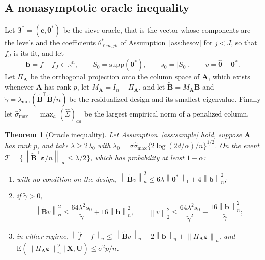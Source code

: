 \documentclass[12pt]{article} %
\newtheorem{theorem}{Theorem}
\theoremstyle{definition}
\newcommand{\R}{\mathbb{R}}
\newcommand{\E}{\mathrm{E}}
\newcommand{\T}{^{\top}}
\newcommand{\norm}[1]{\left\lVert #1 \right\rVert}
\newcommand{\normn}[1]{\left\lVert #1 \right\rVert_{n}}
\newcommand{\cv}{\ell}
\newcommand{\md}{m}
\newcommand{\lev}{j}
\newcommand{\tsl}{k}
\newcommand{\bX}{\mathbf{X}}
\newcommand{\bU}{\mathbf{U}}
\newcommand{\coefs}[4]{\theta^{*}_{#1#2,#3#4}}
\newcommand{\btheta}{\boldsymbol{\theta}}
\newcommand{\thetastar}{\btheta^{*}}
\newcommand{\thetahat}{\widehat{\btheta}}
\newcommand{\bbeta}{\boldsymbol{\beta}}
\newcommand{\betastar}{\bbeta^{*}}
\newcommand{\bc}{\mathbf{c}}
\newcommand{\Gramhat}{\widehat{\Sigma}}
\newcommand{\pen}{\lambda}
\newcommand{\Szero}{S_{0}}
\newcommand{\Amat}{\mathbf{A}}
\newcommand{\Bmat}{\mathbf{B}}
\newcommand{\Btil}{\widetilde{\Bmat}}
\newcommand{\PA}{\Pi_{\Amat}}
\newcommand{\MA}{M_{\Amat}}
\newcommand{\bveps}{\boldsymbol{\varepsilon}}
\newcommand{\bb}{\mathbf{b}}
\newcommand{\smax}{\widehat{\sigma}_{\max}}
\newcommand{\gtil}{\widetilde{\gamma}}
\newcommand{\lmin}{\lambda_{\min}}
\begin{document}
\subsection{A nonasymptotic oracle inequality}
\label{sec:oracle}

Let $\betastar = (\bc,\thetastar)$ be the sieve oracle, that is the vector
whose components are the levels and the coefficients
$\coefs{\cv}{\md}{\lev}{\tsl}$ of Assumption~\ref{ass:besov} for $\lev < J$,
so that $f_J$ is its fit, and let
\[
  \bb = f - f_J \in \R^{n}, \qquad \Szero = \mathrm{supp}(\thetastar),
  \qquad s_0 = |\Szero|, \qquad v = \thetahat - \thetastar .
\]
Let $\PA$ be the orthogonal projection onto the column space of $\Amat$, which
exists whenever $\Amat$ has rank $p$, let $\MA = I_n - \PA$, and let
$\Btil = \MA\Bmat$ and $\gtil = \lmin(\Btil\T\Btil/n)$ be the residualized
design and its smallest eigenvalue. Finally let
$\smax^{2} = \max_a (\Gramhat)_{aa}$ be the largest empirical norm of a
penalized column.

\begin{theorem}[Oracle inequality]
\label{thm:oracle}
Let Assumption~\ref{ass:sample} hold, suppose $\Amat$ has rank $p$, and take
$\pen \ge 2\pen_0$ with
$\pen_0 = \sigma\smax\{2\log(2d/\alpha)/n\}^{1/2}$. On the event
$\mathcal{T} = \{\norm{\Btil\T\bveps/n}_{\infty} \le \pen/2\}$, which has
probability at least $1 - \alpha$:
\begin{enumerate}
\item[(i)] with no condition on the design,
$\normn{\Btil v}^{2} \le 6\pen\norm{\thetastar}_{1} + 4\normn{\bb}^{2}$;
\item[(ii)] if $\gtil > 0$,
\[
  \normn{\Btil v}^{2} \le \frac{64\pen^{2}s_0}{\gtil} + 16\normn{\bb}^{2},
  \qquad
  \norm{v}_{2}^{2} \le \frac{64\pen^{2}s_0}{\gtil^{2}}
  + \frac{16\normn{\bb}^{2}}{\gtil} ;
\]
\item[(iii)] in either regime,
$\normn{\widehat{f}-f} \le \normn{\Btil v} + 2\normn{\bb}
+ \normn{\PA\bveps}$, and
$\E(\normn{\PA\bveps}^{2}\mid\bX,\bU) \le \sigma^{2}p/n$.
\end{enumerate}
\end{theorem}
\end{document}

